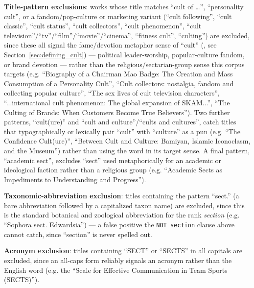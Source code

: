 \textbf{Title-pattern exclusions}: works whose title matches \enquote{cult of \ldots}, \enquote{personality cult}, or a fandom/pop-culture or marketing variant (\enquote{cult following}, \enquote{cult classic}, \enquote{cult status}, \enquote{cult collectors}, \enquote{cult phenomenon}, \enquote{cult television}/\enquote{tv}/\enquote{film}/\enquote{movie}/\enquote{cinema}, \enquote{fitness cult}, \enquote{culting}) are excluded, since these all signal the fame/devotion metaphor sense of \enquote{cult} (\cultfame{}, see Section~\ref{sec:defining_cult}) — political leader-worship, popular-culture fandom, or brand devotion — rather than the religious/sectarian-group sense this corpus targets (e.g. \enquote{Biography of a Chairman Mao Badge: The Creation and Mass Consumption of a Personality Cult}, \enquote{Cult collectors: nostalgia, fandom and collecting popular culture}, \enquote{The sex lives of cult television characters}, \enquote{...international cult phenomenon: The global expansion of SKAM...}, \enquote{The Culting of Brands: When Customers Become True Believers}). Two further patterns, \enquote{cult(ure)} and \enquote{cult and culture}/\enquote{cults and cultures}, catch titles that typographically or lexically pair \enquote{cult} with \enquote{culture} as a pun (e.g. \enquote{The Confidence Cult(ure)}, \enquote{Between Cult and Culture: Bamiyan, Islamic Iconoclasm, and the Museum}) rather than using the word in its target sense. A final pattern, \enquote{academic sect}, excludes \enquote{sect} used metaphorically for an academic or ideological faction rather than a religious group (e.g. \enquote{Academic Sects as Impediments to Understanding and Progress}).

\textbf{Taxonomic-abbreviation exclusion}: titles containing the pattern \enquote{sect.} (a bare abbreviation followed by a capitalized taxon name) are excluded, since this is the standard botanical and zoological abbreviation for the rank \emph{section} (e.g. \enquote{Sophora sect. Edwardsia}) — a false positive the \texttt{NOT section} clause above cannot catch, since \enquote{section} is never spelled out.

\textbf{Acronym exclusion}: titles containing \enquote{SECT} or \enquote{SECTS} in all capitals are excluded, since an all-caps form reliably signals an acronym rather than the English word (e.g. the \enquote{Scale for Effective Communication in Team Sports (SECTS)}).

